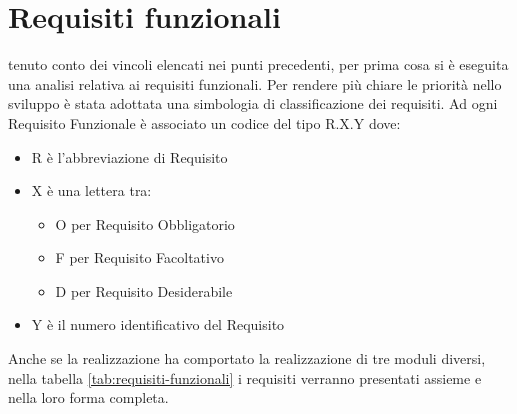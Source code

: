 \section{Requisiti funzionali}
tenuto conto dei vincoli elencati nei punti precedenti, per prima cosa si è eseguita una analisi relativa ai requisiti funzionali.
Per rendere più chiare le priorità nello sviluppo è stata adottata una simbologia di
classificazione dei requisiti.
Ad ogni Requisito Funzionale è associato un codice del tipo R.X.Y dove:
\begin{itemize}
\item R è l’abbreviazione di Requisito
\item X è una lettera tra:
\begin{itemize}
	\item O per Requisito Obbligatorio
	\item F per Requisito Facoltativo
	\item D per Requisito Desiderabile
\end{itemize}
\item Y è il numero identificativo del Requisito
\end{itemize}
Anche se la realizzazione ha comportato la realizzazione di tre moduli diversi, nella tabella \ref{tab:requisiti-funzionali} i requisiti verranno presentati assieme e nella loro forma completa.
\begingroup
\renewcommand\arraystretch{2}
